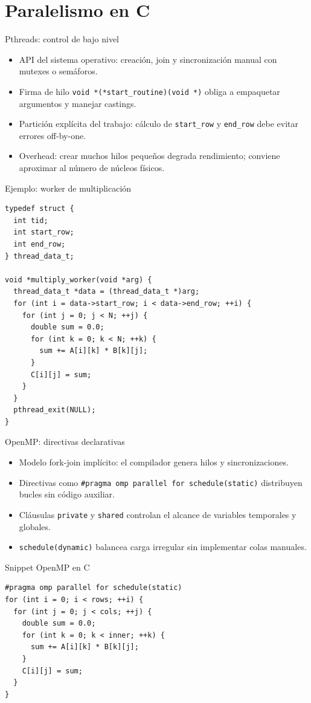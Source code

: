 \section{Paralelismo en C}

\begin{frame}{Pthreads: control de bajo nivel}
  \begin{itemize}
    \item API del sistema operativo: creación, join y sincronización manual con mutexes o semáforos.
    \item Firma de hilo \texttt{void *(*start\_routine)(void *)} obliga a empaquetar argumentos y manejar castings.
    \item Partición explícita del trabajo: cálculo de \texttt{start\_row} y \texttt{end\_row} debe evitar errores off-by-one.
    \item Overhead: crear muchos hilos pequeños degrada rendimiento; conviene aproximar al número de núcleos físicos.
  \end{itemize}
\end{frame}

\begin{frame}[fragile]{Ejemplo: worker de multiplicación}
  \lstset{language=C}
  \begin{lstlisting}
typedef struct {
  int tid;
  int start_row;
  int end_row;
} thread_data_t;

void *multiply_worker(void *arg) {
  thread_data_t *data = (thread_data_t *)arg;
  for (int i = data->start_row; i < data->end_row; ++i) {
    for (int j = 0; j < N; ++j) {
      double sum = 0.0;
      for (int k = 0; k < N; ++k) {
        sum += A[i][k] * B[k][j];
      }
      C[i][j] = sum;
    }
  }
  pthread_exit(NULL);
}
  \end{lstlisting}
\end{frame}

\begin{frame}{OpenMP: directivas declarativas}
  \begin{itemize}
    \item Modelo fork-join implícito: el compilador genera hilos y sincronizaciones.
    \item Directivas como \texttt{\#pragma omp parallel for schedule(static)} distribuyen bucles sin código auxiliar.
    \item Cláusulas \texttt{private} y \texttt{shared} controlan el alcance de variables temporales y globales.
    \item \texttt{schedule(dynamic)} balancea carga irregular sin implementar colas manuales.
  \end{itemize}
\end{frame}

\begin{frame}[fragile]{Snippet OpenMP en C}
  \lstset{language=C}
  \begin{lstlisting}
#pragma omp parallel for schedule(static)
for (int i = 0; i < rows; ++i) {
  for (int j = 0; j < cols; ++j) {
    double sum = 0.0;
    for (int k = 0; k < inner; ++k) {
      sum += A[i][k] * B[k][j];
    }
    C[i][j] = sum;
  }
}
  \end{lstlisting}
\end{frame}
